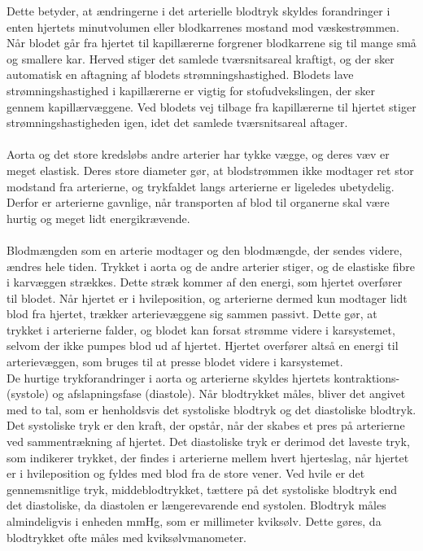 Dette betyder, at ændringerne i det arterielle blodtryk skyldes forandringer i enten hjertets minutvolumen eller blodkarrenes mostand mod væskestrømmen.
Når blodet går fra hjertet til kapillærerne forgrener blodkarrene sig til mange små og smallere kar. Herved stiger det samlede tværsnitsareal kraftigt, og der sker automatisk en aftagning af blodets strømningshastighed. Blodets lave strømningshastighed i kapillærerne er vigtig for stofudvekslingen, der sker gennem kapillærvæggene. Ved blodets vej tilbage fra kapillærerne til hjertet stiger strømningshastigheden igen, idet det samlede tværsnitsareal aftager. \\\\
Aorta og det store kredsløbs andre arterier har tykke vægge, og deres væv er meget elastisk. Deres store diameter gør, at blodstrømmen ikke modtager ret stor modstand fra arterierne, og trykfaldet langs arterierne er ligeledes ubetydelig. Derfor er arterierne gavnlige, når transporten af blod til organerne skal være hurtig og meget lidt energikrævende.\\\\
Blodmængden som en arterie modtager og den blodmængde, der sendes videre, ændres hele tiden. Trykket i aorta og de andre arterier stiger, og de elastiske fibre i karvæggen strækkes. Dette stræk kommer af den energi, som hjertet overfører til blodet. Når hjertet er i hvileposition, og arterierne dermed kun modtager lidt blod fra hjertet, trækker arterievæggene sig sammen passivt. Dette gør, at trykket i arterierne falder, og blodet kan forsat strømme videre i karsystemet, selvom der ikke pumpes blod ud af hjertet. Hjertet overfører altså en energi til arterievæggen, som bruges til at presse blodet videre i karsystemet. \\
De hurtige trykforandringer i aorta og arterierne skyldes hjertets kontraktions- (systole) og afslapningsfase (diastole). Når blodtrykket måles, bliver det angivet med to tal, som er henholdsvis det systoliske blodtryk og det diastoliske blodtryk. Det systoliske tryk er den kraft, der opstår, når der skabes et pres på arterierne ved sammentrækning af hjertet. Det diastoliske tryk er derimod det laveste tryk, som indikerer trykket, der findes i arterierne mellem hvert hjerteslag, når hjertet er i hvileposition og fyldes med blod fra de store vener. 
Ved hvile er det gennemsnitlige tryk, middeblodtrykket, tættere på det systoliske blodtryk end det diastoliske, da diastolen er længerevarende end systolen. 
Blodtryk måles almindeligvis i enheden mmHg, som er millimeter kviksølv. Dette gøres, da blodtrykket ofte måles med kviksølvmanometer. \\\\
